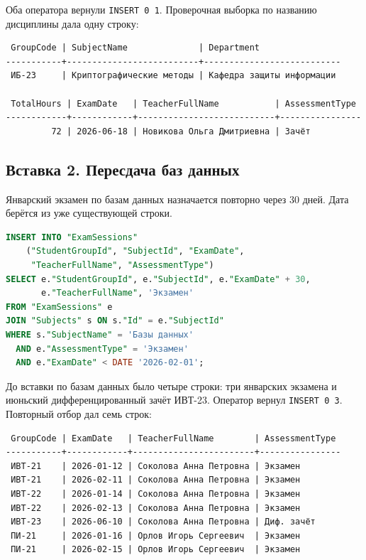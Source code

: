 \documentclass[12pt,a4paper]{article}
\begin{document}
Оба оператора вернули \texttt{INSERT 0 1}. Проверочная выборка по названию дисциплины дала одну строку:

\begin{lstlisting}
 GroupCode | SubjectName              | Department
-----------+--------------------------+---------------------------
 ИБ-23     | Криптографические методы | Кафедра защиты информации

 TotalHours | ExamDate   | TeacherFullName           | AssessmentType
------------+------------+---------------------------+----------------
         72 | 2026-06-18 | Новикова Ольга Дмитриевна | Зачёт
\end{lstlisting}

\subsection*{Вставка 2. Пересдача баз данных}
Январский экзамен по базам данных назначается повторно через 30 дней. Дата берётся из уже существующей строки.

\begin{lstlisting}[language=SQL]
INSERT INTO "ExamSessions"
    ("StudentGroupId", "SubjectId", "ExamDate",
     "TeacherFullName", "AssessmentType")
SELECT e."StudentGroupId", e."SubjectId", e."ExamDate" + 30,
       e."TeacherFullName", 'Экзамен'
FROM "ExamSessions" e
JOIN "Subjects" s ON s."Id" = e."SubjectId"
WHERE s."SubjectName" = 'Базы данных'
  AND e."AssessmentType" = 'Экзамен'
  AND e."ExamDate" < DATE '2026-02-01';
\end{lstlisting}

До вставки по базам данных было четыре строки: три январских экзамена и июньский дифференцированный зачёт ИВТ-23. Оператор вернул \texttt{INSERT 0 3}. Повторный отбор дал семь строк:

\begin{lstlisting}
 GroupCode | ExamDate   | TeacherFullName        | AssessmentType
-----------+------------+------------------------+----------------
 ИВТ-21    | 2026-01-12 | Соколова Анна Петровна | Экзамен
 ИВТ-21    | 2026-02-11 | Соколова Анна Петровна | Экзамен
 ИВТ-22    | 2026-01-14 | Соколова Анна Петровна | Экзамен
 ИВТ-22    | 2026-02-13 | Соколова Анна Петровна | Экзамен
 ИВТ-23    | 2026-06-10 | Соколова Анна Петровна | Диф. зачёт
 ПИ-21     | 2026-01-16 | Орлов Игорь Сергеевич  | Экзамен
 ПИ-21     | 2026-02-15 | Орлов Игорь Сергеевич  | Экзамен
\end{lstlisting}
\end{document}
